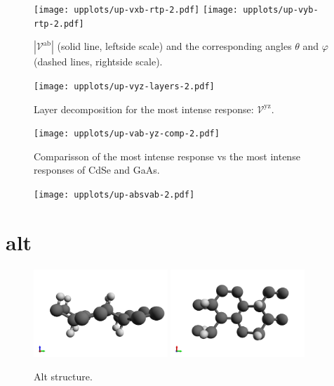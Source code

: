 \documentclass{article}
\let\Oldsection\section
\renewcommand{\section}{\FloatBarrier\Oldsection}
\begin{document}
\begin{figure}[ht]
    \centering
    \texttt{[image: upplots/up-vxb-rtp-2.pdf]}
    \texttt{[image: upplots/up-vyb-rtp-2.pdf]}
    \caption{$|\mathcal{V}^{\mathrm{ab}}|$ (solid line, leftside scale) and the
    corresponding angles $\theta$ and $\varphi$ (dashed lines, rightside scale).}
    \label{fig:up-rtp2}
\end{figure}

\begin{figure}[ht]
    \centering
    \texttt{[image: upplots/up-vyz-layers-2.pdf]}
    \caption{Layer decomposition for the most intense response:
    $\mathcal{V}^{\mathrm{yz}}$.}
    \label{fig:up-lay2}
\end{figure}

\begin{figure}[ht]
    \centering
    \texttt{[image: upplots/up-vab-yz-comp-2.pdf]}
    \caption{Comparisson of the most intense response vs the most intense
    responses of CdSe and GaAs.}
    \label{fig:up-comp2}
\end{figure}

\begin{figure}[ht]
    \centering
    \texttt{[image: upplots/up-absvab-2.pdf]}
    \label{fig:up-xbybcomp-2}
\end{figure}




\section{alt} %
\label{sec:alt}

\begin{figure}[h]
    \centering
    \includegraphics[width=0.45\textwidth]{../alt/alt-figures/alt-1}
    \includegraphics[width=0.45\textwidth]{../alt/alt-figures/alt-2}
    \caption{Alt structure.}
    \label{fig:altstruc}
\end{figure}
\end{document}
